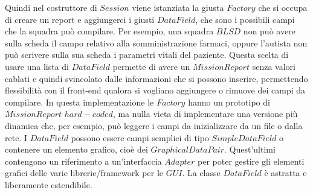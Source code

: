 \documentclass{article}
\begin{document}
    Quindi nel costruttore di $Session$ viene istanziata la giusta $Factory$ che si occupa di creare un report e aggiungerci i giusti $DataField$, che sono i possibili campi che la squadra può compilare.
    Per esempio, una squadra $BLSD$ non può avere sulla scheda il campo relativo alla somministrazione farmaci, oppure l'autista non può scrivere sulla sua scheda i parametri vitali del paziente.
    Questa scelta di usare una lista di $DataField$ permette di avere un $MissionReport$ senza valori cablati e quindi svincolato dalle informazioni che si possono inserire, permettendo flessibilità con il front-end qualora si vogliano aggiungere o rimuove dei campi da compilare.
    \newline In questa implementazione le $Factory$ hanno un prototipo di $MissionReport$ $hard-coded$, ma nulla vieta di implementare una versione più dinamica che, per esempio, può leggere i campi da inizializzare da un file o dalla rete.
    \newline I $DataField$ possono essere campi semplici di tipo $SimpleDataField$ o contenere un elemento grafico, cioè dei $GraphicalDataPair$.
    Quest'ultimi contengono un riferimento a un'interfaccia $Adapter$ per poter gestire gli elementi grafici delle varie librerie/framework per le $GUI$.
    La classe $DataField$ è astratta e liberamente estendibile.
\end{document}
